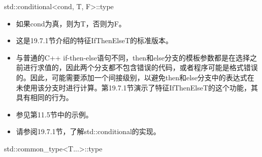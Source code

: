 std::conditional<cond, T, F>::type

\begin{itemize}
\item
如果cond为真，则为T，否则为F。

\item
这是19.7.1节介绍的特征IfThenElseT的标准版本。

\item
与普通的C++ if-then-else语句不同，then和else分支的模板参数都是在选择之前进行求值的，因此两个分支都不包含错误的代码，或者程序可能是格式错误的。因此，可能需要添加一个间接级别，以避免then和else分支中的表达式在未使用该分支时进行计算。第19.7.1节演示了特征IfThenElseT的这个功能，其具有相同的行为。

\item
参见第11.5节中的示例。

\item
请参阅19.7.1节，了解std::conditional的实现。
\end{itemize}

std::common\_type<T...>::type

